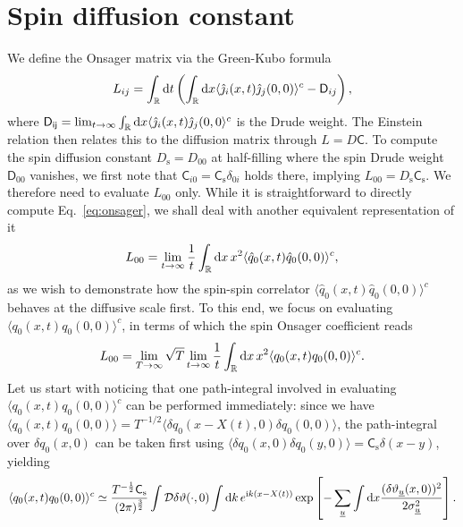 \documentclass[
twocolumn,
amsfonts,
showpacs,
superscriptaddress,
amsmath,
amssymb,
aps,
longbibliography,
prl,
noeprint
]{revtex4-2}
\newcommand{\ii}{{\rm i}}
\newcommand{\dd}{{\rm d}}
\newcommand{\1}{{\bf 1}}
\begin{document}
\section{Spin diffusion constant}
We define the Onsager matrix via the Green-Kubo formula
\begin{equation}\label{eq:onsager}
    L_{ij}=\int_\mathbb{R}\dd t\left(\int_\mathbb{R}\dd x\langle \hat{\jmath}_i(x,t)\hat{\jmath}_j(0,0)\rangle^c-\mathsf{D}_{ij}\right),
\end{equation}
where $\mathsf{D_{ij}}=\lim_{t\to\infty}\int_\mathbb{R}\dd x\langle \hat{\jmath}_i(x,t)\hat{\jmath}_j(0,0\rangle^c$ is the Drude weight. The Einstein relation then relates this to the diffusion matrix through $L=D\mathsf{C}$. To compute the spin diffusion constant $D_\mathrm{s}=D_{00}$ at half-filling where the spin Drude weight $\mathsf{D}_{00}$ vanishes, we first note that $\mathsf{C}_{i0}=\mathsf{C}_\mathrm{s}\delta_{0i}$ holds there, implying ${L}_{00}=D_\mathrm{s}\mathsf{C}_\mathrm{s}$. We therefore need to evaluate ${L}_{00}$ only. While it is straightforward to directly compute Eq.~\eqref{eq:onsager}, we shall deal with another equivalent representation of it
\begin{equation}
  L_{00}= \lim_{t\to\infty}\frac{1}{t}\int_\mathbb{R}\dd x\,x^2\langle \hat{q}_0(x,t)\hat{q}_0(0,0)\rangle^c,
\end{equation}
as we wish to demonstrate how the spin-spin correlator $\langle \hat{q}_0(x,t)\hat{q}_0(0,0)\rangle^c$ behaves at the diffusive scale first.
To this end, we focus on evaluating $\langle q_0(x,t) q_0(0,0)\rangle^c$, in terms of which the spin Onsager coefficient reads
\begin{equation}\label{eq:ons}
   L_{00}=  \lim_{T\to\infty}\sqrt{T}\lim_{t\to\infty}\frac{1}{t}\int_\mathbb{R}\dd x\,x^2\langle q_0(x,t) q_0(0,0)\rangle^c.
\end{equation}
Let us start with noticing that one path-integral involved in evaluating $\langle q_0(x,t) q_0(0,0)\rangle^c$ can be performed immediately: since we have $\langle q_0(x,t) q_0(0,0)\rangle=T^{-1/2}\langle \delta q_0(x-X(t),0) \delta q_0(0,0)\rangle$, the path-integral over $\delta q_0(x,0)$ can be taken first using $\langle \delta q_0(x,0) \delta q_0(y,0)\rangle=\mathsf{C}_\mathrm{s}\delta(x-y)$, yielding
\begin{equation}
    \label{eq:qq_asymp1}
    \langle q_0(x,t) q_0(0,0)\rangle^c \simeq \frac{T^{-\frac{1}{2}}\mathsf{C}_\mathrm{s}}{(2\pi)^\frac{3}{2}}\int\mathcal{D}\delta\vartheta(\cdot,0)\int\dd k\,e^{\ii k(x-X(t))}\exp\left[-\sum_{\underline{u}}\int\dd x\frac{(\delta\vartheta_{\underline{u}}(x,0))^2}{2\sigma^2_{\underline{u}}}\right].
\end{equation}
\end{document}
